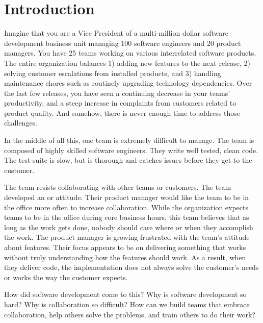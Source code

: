 

\chapter{Introduction}
\label{IntroductionChapter}

Imagine that you are a Vice President of a multi-million dollar software development business unit managing 100 software engineers and 20 product managers. You have 25 teams working on various interrelated software products. The entire organization balances 1) adding new features to the next release, 2) solving customer escalations from installed products, and 3) handling maintenance chores such as routinely upgrading technology dependencies. Over the last few releases, you have seen a continuing decrease in your teams’ productivity, and a steep increase in complaints from customers related to product quality. And somehow, there is never enough time to address those challenges.

In the middle of all this, one team is extremely difficult  to manage. The team is composed of highly skilled software engineers. They write well tested, clean code. The test suite is slow, but is thorough and catches issues before they get to the customer. 

The team resists collaborating with other teams or customers. The team developed an  or  attitude. Their product manager would like the team to be in the office more often to increase collaboration. While the organization expects teams to be in the office during core business hours, this team believes that as long as the work gets done, nobody should care where or when they accomplish the work. The product manager is growing frustrated with the team’s attitude about features. Their focus appears to be on delivering something that works without truly understanding how the features should work. As a result, when they deliver code, the implementation does not always solve the customer’s needs or works the way the customer expects. 

How did software development come to this? Why is software development so hard? Why is collaboration so difficult? How can we build teams that embrace collaboration, help others solve the problems, and train others to do their work?

